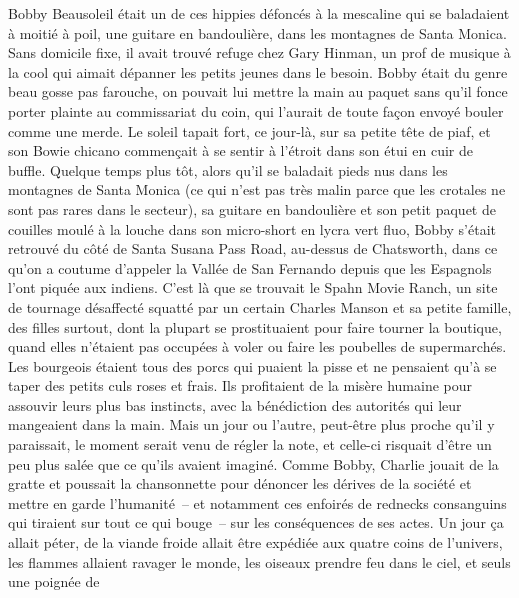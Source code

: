 
Bobby Beausoleil était un de ces hippies défoncés à la mescaline qui se baladaient à moitié à poil, une guitare en bandoulière, dans les montagnes de Santa Monica. Sans domicile fixe, il avait trouvé refuge chez Gary Hinman, un prof de musique à la cool qui aimait dépanner les petits jeunes dans le besoin. Bobby était du genre beau gosse pas farouche, on pouvait lui mettre la main au paquet sans qu’il fonce porter plainte au commissariat du coin, qui l’aurait de toute façon envoyé bouler comme une merde. Le soleil tapait fort, ce jour-là, sur sa petite tête de piaf, et son Bowie chicano commençait à se sentir à l’étroit dans son étui en cuir de buffle. Quelque temps plus tôt, alors qu’il se baladait pieds nus dans les montagnes de Santa Monica (ce qui n’est pas très malin parce que les crotales ne sont pas rares dans le secteur), sa guitare en bandoulière et son petit paquet de couilles moulé à la louche dans son micro-short en lycra vert fluo, Bobby s’était retrouvé du côté de Santa Susana Pass Road, au-dessus de Chatsworth, dans ce qu’on a coutume d’appeler la Vallée de San Fernando depuis que les Espagnols l’ont piquée aux indiens. C’est là que se trouvait le Spahn Movie Ranch, un site de tournage désaffecté squatté par un certain Charles Manson et sa petite famille, des filles surtout, dont la plupart se prostituaient pour faire tourner la boutique, quand elles n’étaient pas occupées à voler ou faire les poubelles de supermarchés. Les bourgeois étaient tous des porcs qui puaient la pisse et ne pensaient qu’à se taper des petits culs roses et frais. Ils profitaient de la misère humaine pour assouvir leurs plus bas instincts, avec la bénédiction des autorités qui leur mangeaient dans la main. Mais un jour ou l’autre, peut-être plus proche qu’il y paraissait, le moment serait venu de régler la note, et celle-ci risquait d’être un peu plus salée que ce qu’ils avaient imaginé. Comme Bobby, Charlie jouait de la gratte et poussait la chansonnette pour dénoncer les dérives de la société et mettre en garde l’humanité~-- et notamment ces enfoirés de rednecks consanguins qui tiraient sur tout ce qui bouge~-- sur les conséquences de ses actes. Un jour ça allait péter, de la viande froide allait être expédiée aux quatre coins de l’univers, les flammes allaient ravager le monde, les oiseaux prendre feu dans le ciel, et seuls une poignée de 